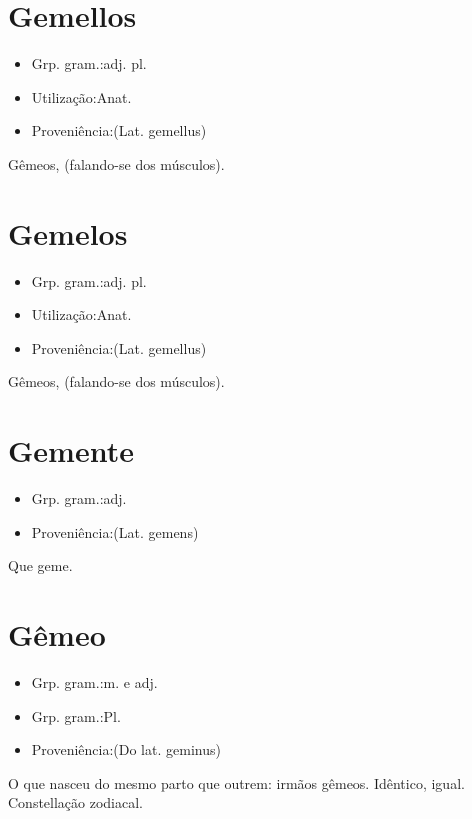 \section{Gemellos}
\begin{itemize}
\item {Grp. gram.:adj. pl.}
\end{itemize}
\begin{itemize}
\item {Utilização:Anat.}
\end{itemize}
\begin{itemize}
\item {Proveniência:(Lat. \textunderscore gemellus\textunderscore )}
\end{itemize}
Gêmeos, (falando-se dos músculos).
\section{Gemelos}
\begin{itemize}
\item {Grp. gram.:adj. pl.}
\end{itemize}
\begin{itemize}
\item {Utilização:Anat.}
\end{itemize}
\begin{itemize}
\item {Proveniência:(Lat. \textunderscore gemellus\textunderscore )}
\end{itemize}
Gêmeos, (falando-se dos músculos).
\section{Gemente}
\begin{itemize}
\item {Grp. gram.:adj.}
\end{itemize}
\begin{itemize}
\item {Proveniência:(Lat. \textunderscore gemens\textunderscore )}
\end{itemize}
Que geme.
\section{Gêmeo}
\begin{itemize}
\item {Grp. gram.:m.  e  adj.}
\end{itemize}
\begin{itemize}
\item {Grp. gram.:Pl.}
\end{itemize}
\begin{itemize}
\item {Proveniência:(Do lat. \textunderscore geminus\textunderscore )}
\end{itemize}
O que nasceu do mesmo parto que outrem: \textunderscore irmãos gêmeos\textunderscore .
Idêntico, igual.
Constellação zodiacal.
